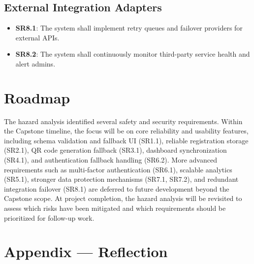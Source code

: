 \documentclass[12pt]{article}
\begin{document}
\subsection{External Integration Adapters}
\begin{itemize}
    \item \textbf{SR8.1}: The system shall implement retry queues and failover providers for external APIs.
    \item \textbf{SR8.2}: The system shall continuously monitor third-party service health and alert admins.
\end{itemize}


\section{Roadmap}

The hazard analysis identified several safety and security requirements. Within the Capstone timeline, the focus will be on core reliability and usability features, including schema validation and fallback UI (SR1.1), reliable registration storage (SR2.1), QR code generation fallback (SR3.1), dashboard synchronization (SR4.1), and authentication fallback handling (SR6.2). More advanced requirements such as multi-factor authentication (SR6.1), scalable analytics (SR5.1), stronger data protection mechanisms (SR7.1, SR7.2), and redundant integration failover (SR8.1) are deferred to future development beyond the Capstone scope. At project completion, the hazard analysis will be revisited to assess which risks have been mitigated and which requirements should be prioritized for follow-up work.


\newpage{}

\section*{Appendix --- Reflection}
% 
\end{document}
